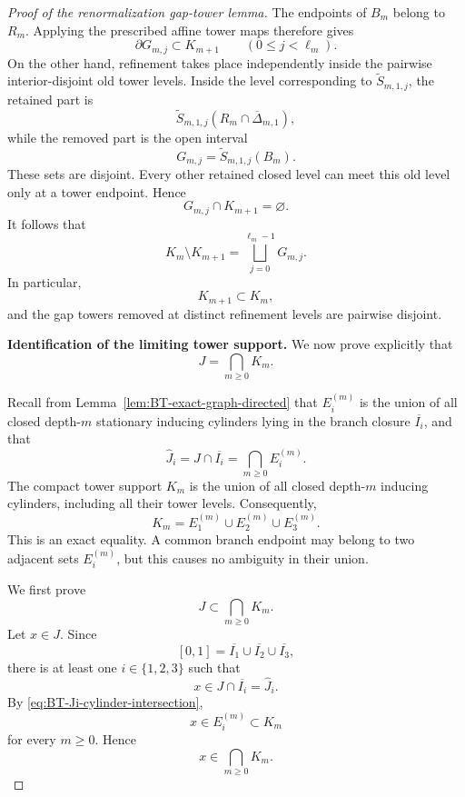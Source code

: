 \documentclass[11pt]{amsart}
\theoremstyle{plain}
\theoremstyle{definition}
\theoremstyle{remark}
\begin{document}
\begin{proof}[Proof of the renormalization gap-tower lemma]
The endpoints of \(B_m\) belong to \(R_m\). Applying the prescribed
affine tower maps therefore gives
\[
        \partial G_{m,j}
        \subset K_{m+1}
        \qquad
        (0\leq j<\ell_m).
\tag{C.6}
\label{eq:BT-gap-boundaries-retained}
\]
On the other hand, refinement takes place independently inside the
pairwise interior-disjoint old tower levels. Inside the level
corresponding to \(\widetilde S_{m,1,j}\), the retained part is
\[
        \widetilde S_{m,1,j}(R_m\cap\overline{\Delta}_{m,1}),
\]
while the removed part is the open interval
\[
        G_{m,j}
        =
        \widetilde S_{m,1,j}(B_m).
\]
These sets are disjoint. Every other retained closed level can meet this
old level only at a tower endpoint. Hence
\[
        G_{m,j}\cap K_{m+1}=\varnothing.
\]
It follows that
\[
        K_m\setminus K_{m+1}
        =
        \bigsqcup_{j=0}^{\ell_m-1}G_{m,j}.
\tag{C.7}
\label{eq:BT-exact-tower-refinement}
\]
In particular,
\[
        K_{m+1}\subset K_m,
\]
and the gap towers removed at distinct refinement levels are pairwise
disjoint.

\smallskip
\noindent
\textbf{Identification of the limiting tower support.}
We now prove explicitly that
\[
        J=\bigcap_{m\geq0}K_m.
\tag{C.8}
\label{eq:BT-J-intersection-Km}
\]

Recall from Lemma~\ref{lem:BT-exact-graph-directed} that
\(E_i^{(m)}\) is the union of all closed depth-\(m\) stationary inducing
cylinders lying in the branch closure \(\overline{I_i}\), and that
\[
        \widehat J_i
        =
        J\cap\overline{I_i}
        =
        \bigcap_{m\geq0}E_i^{(m)}.
\tag{C.9}
\label{eq:BT-Ji-cylinder-intersection}
\]
The compact tower support \(K_m\) is the union of all closed
depth-\(m\) inducing cylinders, including all their tower levels.
Consequently,
\[
        K_m
        =
        E_1^{(m)}
        \cup
        E_2^{(m)}
        \cup
        E_3^{(m)}.
\tag{C.10}
\label{eq:BT-Km-branch-cylinder-union}
\]
This is an exact equality. A common branch endpoint may belong to two
adjacent sets \(E_i^{(m)}\), but this causes no ambiguity in their union.

We first prove
\[
        J\subset\bigcap_{m\geq0}K_m.
\]
Let \(x\in J\). Since
\[
        [0,1]
        =
        \overline{I_1}
        \cup
        \overline{I_2}
        \cup
        \overline{I_3},
\]
there is at least one \(i\in\{1,2,3\}\) such that
\[
        x\in J\cap\overline{I_i}
        =
        \widehat J_i.
\]
By \eqref{eq:BT-Ji-cylinder-intersection},
\[
        x\in E_i^{(m)}
        \subset K_m
\]
for every \(m\geq0\). Hence
\[
        x\in\bigcap_{m\geq0}K_m.
\]


\end{proof}
\end{document}
